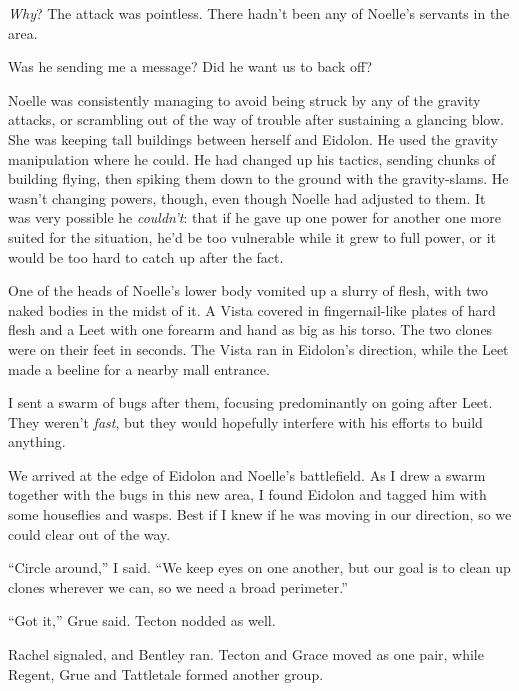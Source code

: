 \emph{Why}?  The attack was pointless.  There hadn't been any of Noelle's servants in the area.



Was he sending me a message?  Did he want us to back off?



Noelle was consistently managing to avoid being struck by any of the gravity attacks, or scrambling out of the way of trouble after sustaining a glancing blow.  She was keeping tall buildings between herself and Eidolon.  He used the gravity manipulation where he could.  He had changed up his tactics, sending chunks of building flying, then spiking them down to the ground with the gravity-slams.  He wasn't changing powers, though, even though Noelle had adjusted to them.  It was very possible he \emph{couldn't}: that if he gave up one power for another one more suited for the situation, he'd be too vulnerable while it grew to full power, or it would be too hard to catch up after the fact.



One of the heads of Noelle's lower body vomited up a slurry of flesh, with two naked bodies in the midst of it.  A Vista covered in fingernail-like plates of hard flesh and a Leet with one forearm and hand as big as his torso.  The two clones were on their feet in seconds.  The Vista ran in Eidolon's direction, while the Leet made a beeline for a nearby mall entrance.



I sent a swarm of bugs after them, focusing predominantly on going after Leet.  They weren't \emph{fast}, but they would hopefully interfere with his efforts to build anything.



We arrived at the edge of Eidolon and Noelle's battlefield.  As I drew a swarm together with the bugs in this new area, I found Eidolon and tagged him with some houseflies and wasps.  Best if I knew if he was moving in our direction, so we could clear out of the way.



``Circle around,'' I said.  ``We keep eyes on one another, but our goal is to clean up clones wherever we can, so we need a broad perimeter.''



``Got it,'' Grue said.  Tecton nodded as well.



Rachel signaled, and Bentley ran.  Tecton and Grace moved as one pair, while Regent, Grue and Tattletale formed another group.



